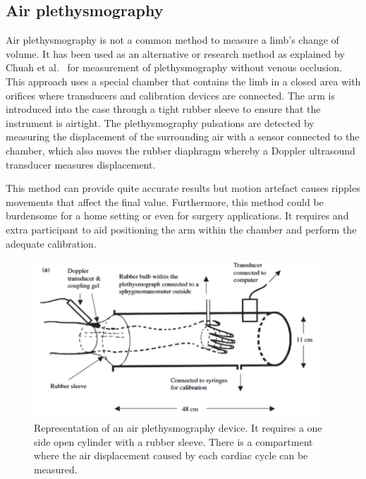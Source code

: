 \subsection{Air plethysmography}
\label{section literature 3.1}
Air plethysmography is not a common method to measure a limb’s change of volume. It has been used as an alternative or research method as explained by Chuah et al.~\cite{chuah2004plethysmography} for measurement of plethysmography without venous occlusion. This approach uses a special chamber that contains the limb in a closed area with orifices where transducers and calibration devices are connected. The arm is introduced into the case through a tight rubber sleeve to ensure that the instrument is airtight.  The plethysmography pulsations are detected by measuring the displacement of the surrounding air with a sensor connected to the chamber, which also moves the rubber diaphragm whereby a Doppler ultrasound transducer measures displacement. 

This method can provide quite accurate results but motion artefact causes ripples movements that affect the final value. Furthermore, this method could be burdensome for a home setting or even for surgery applications. It requires and extra participant to aid positioning the arm within the chamber and perform the adequate calibration.

\begin{figure}[!htpb]
	\centering
	\includegraphics[width=0.95\textwidth,keepaspectratio]{figure4}    
	\caption[Air plethysmography method]{Representation of an air plethysmography device. It requires a one side open cylinder with a rubber sleeve. There is a compartment where the air displacement caused by each cardiac cycle can be measured.}
	\label{fig:air plethysmography}
\end{figure}

